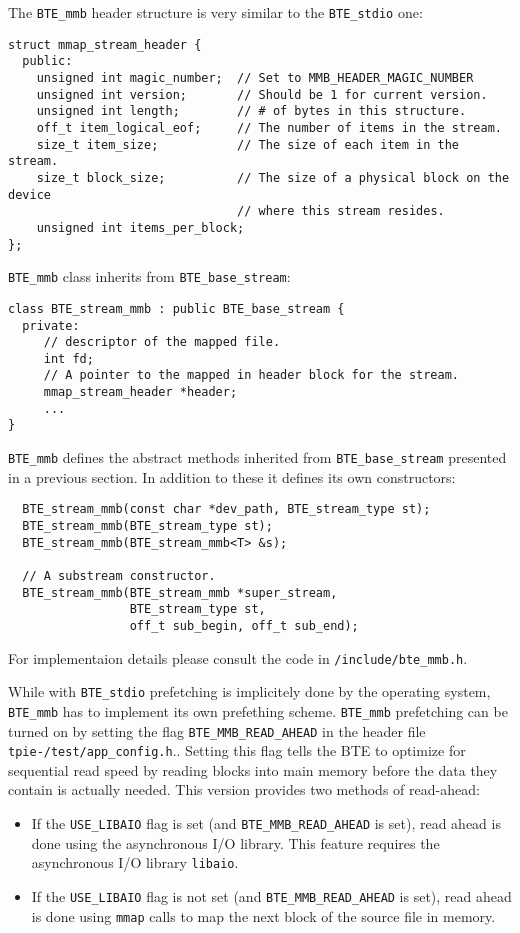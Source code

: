 The \verb|BTE_mmb| header structure is very similar to the \verb|BTE_stdio|
one:
\begin{verbatim}
struct mmap_stream_header { 
  public:
    unsigned int magic_number;  // Set to MMB_HEADER_MAGIC_NUMBER
    unsigned int version;       // Should be 1 for current version.
    unsigned int length;        // # of bytes in this structure.
    off_t item_logical_eof;     // The number of items in the stream.
    size_t item_size;           // The size of each item in the stream.
    size_t block_size;          // The size of a physical block on the device
                                // where this stream resides.
    unsigned int items_per_block;
};
\end{verbatim}

\verb|BTE_mmb| class inherits from \verb|BTE_base_stream|:
\begin{verbatim}
class BTE_stream_mmb : public BTE_base_stream {
  private:
     // descriptor of the mapped file.  
     int fd;   
     // A pointer to the mapped in header block for the stream. 
     mmap_stream_header *header;
     ...
}  
\end{verbatim}

\verb|BTE_mmb| defines the abstract methods inherited from
\verb|BTE_base_stream| presented in a previous section. In addition to
these it defines its own constructors:
\begin{verbatim}
  BTE_stream_mmb(const char *dev_path, BTE_stream_type st); 
  BTE_stream_mmb(BTE_stream_type st); 
  BTE_stream_mmb(BTE_stream_mmb<T> &s); 
  
  // A substream constructor.
  BTE_stream_mmb(BTE_stream_mmb *super_stream,
                 BTE_stream_type st,
                 off_t sub_begin, off_t sub_end);
\end{verbatim}

For implementaion details please consult the code in
\verb|/include/bte_mmb.h|.

While with \verb|BTE_stdio| prefetching is implicitely done by the
operating system, \verb|BTE_mmb| has to implement its own prefething
scheme. \verb|BTE_mmb| prefetching can be turned on by setting the flag
\verb|BTE_MMB_READ_AHEAD| in the header file {\tt
  tpie-\version/test/app\_config.h}..
Setting this flag tells the BTE to optimize for sequential read speed by
reading blocks into main memory before the data they contain is actually
needed. This version provides two methods of read-ahead:
\begin{itemize}
\item If the \verb|USE_LIBAIO| flag is set (and \verb|BTE_MMB_READ_AHEAD|
  is set), read ahead is done using the asynchronous I/O library.  This
  feature requires the asynchronous I/O library {\tt libaio}.
\item If the \verb|USE_LIBAIO| flag is not set (and
  \verb|BTE_MMB_READ_AHEAD| is set), read ahead is done using \verb|mmap|
  calls to map the next block of the source file in memory.
\end{itemize}

